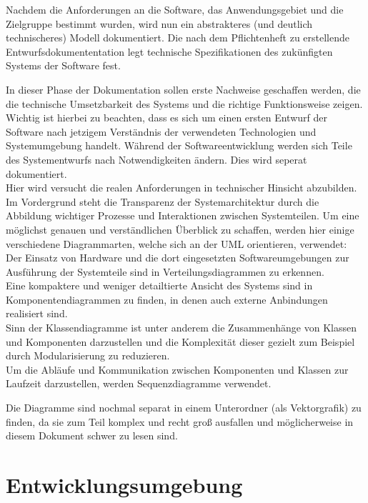 Nachdem die Anforderungen an die Software, das Anwendungsgebiet und die Zielgruppe bestimmt wurden, wird nun ein abstrakteres (und deutlich technischeres) Modell dokumentiert. Die nach dem Pflichtenheft zu erstellende Entwurfsdokumententation  legt technische Spezifikationen des zukünfigten Systems der Software fest.

In dieser Phase der Dokumentation sollen erste Nachweise geschaffen werden, die die technische Umsetzbarkeit des Systems
und die richtige Funktionsweise zeigen. Wichtig ist hierbei zu beachten, dass es sich um einen ersten Entwurf der Software nach jetzigem Verständnis der verwendeten Technologien und Systemumgebung handelt. Während der Softwareentwicklung werden sich Teile des Systementwurfs nach Notwendigkeiten ändern. Dies wird seperat dokumentiert.\\


Hier wird versucht die realen Anforderungen in technischer Hinsicht abzubilden.
Im Vordergrund steht die Transparenz der Systemarchitektur durch die Abbildung wichtiger Prozesse und Interaktionen zwischen Systemteilen.
Um eine möglichst genauen und verständlichen Überblick zu schaffen, werden hier einige verschiedene Diagrammarten, welche sich an der UML orientieren, verwendet:\\
Der Einsatz von Hardware und die dort eingesetzten Softwareumgebungen zur Ausführung der Systemteile sind in Verteilungsdiagrammen zu erkennen.\\
Eine kompaktere und weniger detailtierte Ansicht des Systems sind in Komponentendiagrammen zu finden, in denen auch externe Anbindungen realisiert sind.\\
Sinn der Klassendiagramme ist unter anderem die Zusammenhänge von Klassen und Komponenten darzustellen und die Komplexität dieser gezielt zum Beispiel durch
Modularisierung zu reduzieren.\\
Um die Abläufe und Kommunikation zwischen Komponenten und Klassen zur Laufzeit darzustellen, werden Sequenzdiagramme verwendet.\\
\begin{tcolorbox}
Die Diagramme sind nochmal separat in einem Unterordner (als Vektorgrafik) zu finden, da sie zum Teil komplex und recht groß ausfallen und möglicherweise in diesem Dokument schwer zu lesen sind.
\end{tcolorbox}

\newpage
\section{Entwicklungsumgebung}\label{sec:entwicklungsumgebung}

